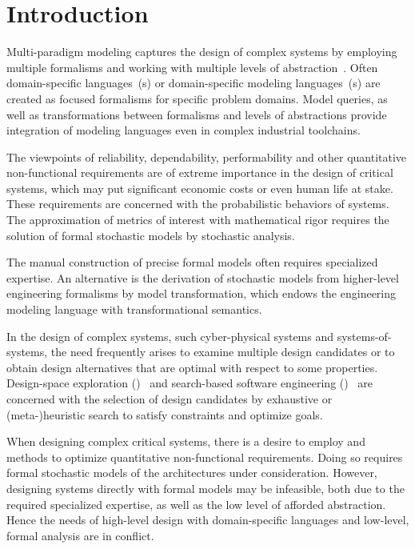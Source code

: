 \chapter{Introduction}
\label{chap:intro}

Multi-paradigm modeling captures the design of complex systems by employing multiple formalisms and working with multiple levels of abstraction~\citep{Giese06multiparadigm}. Often domain-specific languages~(s) or domain-specific modeling languages~(s) are created as focused formalisms for specific problem domains. Model queries, as well as transformations between formalisms and levels of abstractions provide integration of modeling languages even in complex industrial toolchains.

The viewpoints of reliability, dependability, performability and other quantitative non-functional requirements are of extreme importance in the design of critical systems, which may put significant economic costs or even human life at stake. These requirements are concerned with the probabilistic behaviors of systems. The approximation of metrics of interest with mathematical rigor requires the solution of formal stochastic models by stochastic analysis.

The manual construction of precise formal models often requires specialized expertise. An alternative is the derivation of stochastic models from higher-level engineering formalisms by model transformation, which endows the engineering modeling language with transformational semantics.

In the design of complex systems, such cyber-physical systems and systems-of-systems, the need frequently arises to examine multiple design candidates or to obtain design alternatives that are optimal with respect to some properties. Design-space exploration ()~ and search-based software engineering ()~ are concerned with the selection of design candidates by exhaustive or (meta-)heuristic search to satisfy constraints and optimize goals.

When designing complex critical systems, there is a desire to employ  and  methods to optimize quantitative non-functional requirements. Doing so requires formal stochastic models of the architectures under consideration. However, designing systems directly with formal models may be infeasible, both due to the required specialized expertise, as well as the low level of afforded abstraction. Hence the needs of high-level design with domain-specific languages and low-level, formal analysis are in conflict.

